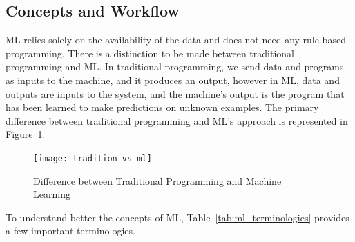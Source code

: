 \subsection{Concepts and Workflow}

\gls{ML} relies solely on the availability of the data and does not need any rule-based programming. There is a distinction to be made between traditional programming and \gls{ML}. In traditional programming, we send data and programs as inputs to the machine, and it produces an output, however in \gls{ML}, data and outputs are inputs to the system, and the machine's output is the program that has been learned to make predictions on unknown examples. The primary difference between traditional programming and \gls{ML}'s approach is represented in Figure~\ref{fig:tradition_vs_ml}.

\begin{figure}[htbp]
    \centering
    \texttt{[image: tradition\_vs\_ml]}
    \caption{Difference between Traditional Programming and Machine Learning~\cite{Kassel2017PredictingAzavea}}
    \label{fig:tradition_vs_ml}
\end{figure}

To understand better the concepts of \gls{ML}, Table~\ref{tab:ml_terminologies} provides a few important terminologies.


